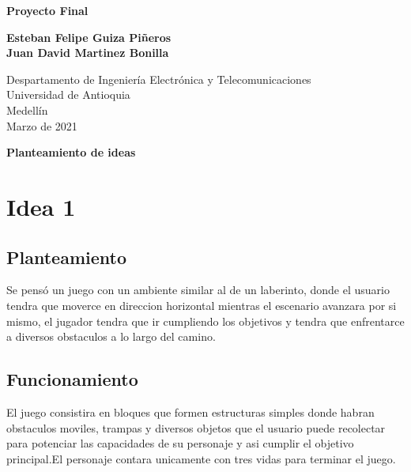 \documentclass{article}
\begin{document}
\begin{titlepage}
    \begin{center}
        \vspace*{1cm}
            
        \Huge
        \textbf{Proyecto Final}
            
        \vspace{0.5cm}
        \LARGE
        
            
        \vspace{5cm}
            
        \textbf{Esteban Felipe Guiza Piñeros}\\
        \textbf{Juan David Martinez Bonilla}
            
        \vfill
            
        \vspace{0.8cm}
            
        \Large
        Despartamento de Ingeniería Electrónica y Telecomunicaciones\\
        Universidad de Antioquia\\
        Medellín\\
        Marzo de 2021
            
    \end{center}
\end{titlepage}
\begin{center}
\Huge
\textbf{Planteamiento de ideas }
\end{center}

\section{Idea 1}
\subsection{Planteamiento}
Se pensó un juego  con  un ambiente   similar al de un laberinto, donde el usuario tendra que moverce en direccion horizontal mientras el escenario avanzara por si mismo,  el jugador tendra que ir cumpliendo los objetivos y  tendra que enfrentarce a diversos obstaculos a lo largo del camino.

\subsection{Funcionamiento}
El juego consistira  en bloques que formen estructuras simples  donde  habran obstaculos moviles, trampas  y diversos objetos que el usuario puede recolectar  para potenciar las capacidades de su personaje y asi cumplir  el objetivo principal.El personaje contara  unicamente con  tres vidas para  terminar el juego.
\end{document}
